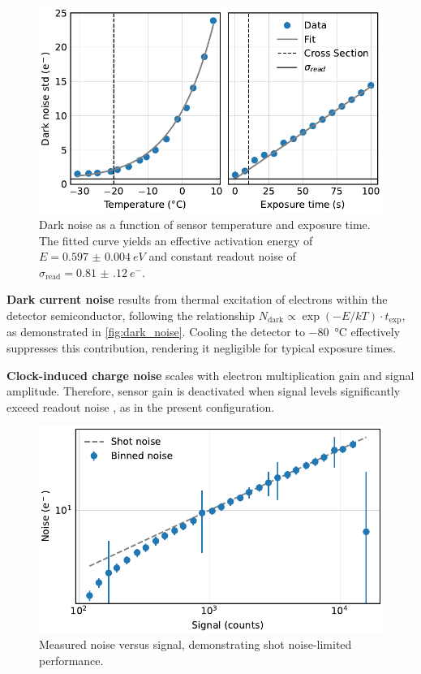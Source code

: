 \documentclass[
	parskip=half,
	a4paper,
]{scrarticle}
\begin{document}
\begin{figure}[hb]
    \centering
    \includegraphics{../analysis/figures/dark_noise.pdf}
    \caption{Dark noise as a function of sensor temperature and exposure time. The fitted curve yields an effective activation energy of $E = \SI{0.597(4)}{eV}$ and constant readout noise of $\sigma_{\text{read}} = \SI{0.81(12)}{e^-}$.}
    \label{fig:dark_noise}
\end{figure}

\textbf{Dark current noise} results from thermal excitation of electrons within the detector semiconductor, following the relationship $N_\text{dark} \propto \exp(-E / kT) \cdot t_\text{exp}$, as demonstrated in \autoref{fig:dark_noise}. Cooling the detector to \SI{-80}{\degreeCelsius} effectively suppresses this contribution, rendering it negligible for typical exposure times.

\textbf{Clock-induced charge noise} scales with electron multiplication gain and signal amplitude. Therefore, sensor gain is deactivated when signal levels significantly exceed readout noise \cite{andor_establishing_nodate}, as in the present configuration.

\begin{figure}
    \centering
    \includegraphics{../analysis/figures/shot noise.pdf}
    \caption{Measured noise versus signal, demonstrating shot noise-limited performance.}
    \label{fig:shotnoise}
\end{figure}
\end{document}
